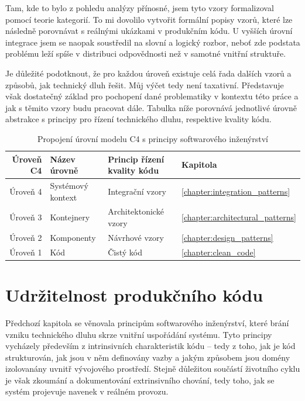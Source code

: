 \documentclass[FM,DP,fonts]{tulthesis}
\renewcommand{\arraystretch}{1.2}
\begin{document}
Tam, kde to bylo z pohledu analýzy přínosné, jsem tyto vzory formalizoval pomocí teorie kategorií. To mi dovolilo vytvořit formální popisy vzorů, které lze následně porovnávat s reálnými ukázkami v produkčním kódu. U vyšších úrovní integrace jsem se naopak soustředil na slovní a logický rozbor, neboť zde podstata problému leží spíše v distribuci odpovědnosti než v samotné vnitřní struktuře.

Je důležité podotknout, že pro každou úroveň existuje celá řada dalších vzorů a způsobů, jak technický dluh řešit. Můj výčet tedy není taxativní. Představuje však dostatečný základ pro pochopení dané problematiky v kontextu této práce a jak s těmito vzory budu pracovat dále. Tabulka níže porovnává jednotlivé úrovně abstrakce s principy pro řízení technického dluhu, respektive kvality kódu.

\begin{table}[H]
	\centering
	\renewcommand{\arraystretch}{2}
	\begin{tabular}{| r | l | l | l |}
		\hline
		\textbf{Úroveň C4} & \textbf{Název úrovně} & \textbf{Princip řízení kvality kódu} & \textbf{Kapitola}                    \\
		\hline
		Úroveň 4           & Systémový kontext     & Integrační vzory                     & \ref{chapter:integration_patterns}   \\
		\hline
		Úroveň 3           & Kontejnery            & Architektonické vzory                & \ref{chapter:architectural_patterns} \\
		\hline
		Úroveň 2           & Komponenty            & Návrhové vzory                       & \ref{chapter:design_patterns}        \\
		\hline
		Úroveň 1           & Kód                   & Čistý kód                            & \ref{chapter:clean_code}             \\
		\hline
	\end{tabular}
	\caption{Propojení úrovní modelu C4 s principy softwarového inženýrství}
\end{table}

\chapter{Udržitelnost produkčního kódu}
Předchozí kapitola se věnovala principům softwarového inženýrství, které brání vzniku technického dluhu skrze vnitřní uspořádání systému. Tyto principy vycházely především z intrinsivních charakteristik kódu – tedy z toho, jak je kód strukturován, jak jsou v něm definovány vazby a jakým způsobem jsou domény izolovanány uvnitř vývojového prostředí. Stejně důležitou součástí životního cyklu je však zkoumání a dokumentování extrinsivního chování, tedy toho, jak se systém projevuje navenek v reálném provozu.
\end{document}
